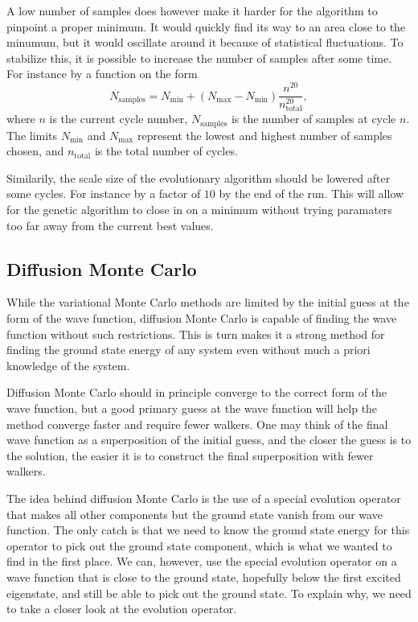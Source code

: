 \documentclass[aps,prb,twocolumn,floatfix]{revtex4}
\begin{document}
A low number of samples does however make it harder for the algorithm to pinpoint a proper minimum. It would quickly find its way to an area close to the minumum, but it would oscillate around it because of statistical fluctuations. To stabilize this, it is possible to increase the number of samples after some time. For instance by a function on the form
\begin{equation}
    N_{\text{samples}} = N_{\text{min}} + (N_{\text{max}} - N_{\text{min}}) \frac{n^{20}}{n^{20}_{\text{total}}},
\end{equation}
where $n$ is the current cycle number, $N_{\text{samples}}$ is the number of samples at cycle $n$. The limits $N_{\text{min}}$ and $N_{\text{max}}$ represent the lowest and highest number of samples chosen, and $n_{\text{total}}$ is the total number of cycles.

Similarily, the scale size of the evolutionary algorithm should be lowered after some cycles. For instance by a factor of $10$ by the end of the run. This will allow for the genetic algorithm to close in on a minimum without trying paramaters too far away from the current best values.



\subsection{Diffusion Monte Carlo} \label{sec:dmc}

While the variational Monte Carlo methods are limited by the initial guess at the form of the wave function, diffusion Monte Carlo is capable of finding the wave function without such restrictions. This is turn makes it a strong method for finding the ground state energy of any system even without much a priori knowledge of the system.

Diffusion Monte Carlo should in principle converge to the correct form of the wave function, but a good primary guess at the wave function will help the method converge faster and require fewer walkers. One may think of the final wave function as a superposition of the initial guess, and the closer the guess is to the solution, the easier it is to construct the final superposition with fewer walkers.

The idea behind diffusion Monte Carlo is the use of a special evolution operator that makes all other components but the ground state vanish from our wave function. The only catch is that we need to know the ground state energy for this operator to pick out the ground state component, which is what we wanted to find in the first place. We can, however, use the special evolution operator on a wave function that is close to the ground state, hopefully below the first excited eigenstate, and still be able to pick out the ground state. To explain why, we need to take a closer look at the evolution operator.
\end{document}
